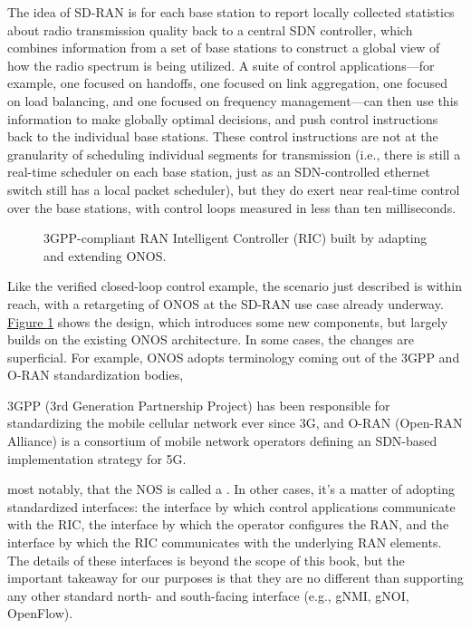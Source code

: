 \documentclass[letterpaper,11pt,english]{sphinxmanual}
\let\sphinxpxdimen\pdfpxdimen\else\newdimen\sphinxpxdimen
\begin{document}
The idea of SD-RAN is for each base station to report locally
collected statistics about radio transmission quality back to a
central SDN controller, which combines information from a set of base
stations to construct a global view of how the radio spectrum is being
utilized. A suite of control applications—for example, one focused on
handoffs, one focused on link aggregation, one focused on load
balancing, and one focused on frequency management—can then use this
information to make globally optimal decisions, and push control
instructions back to the individual base stations. These control
instructions are not at the granularity of scheduling individual
segments for transmission (i.e., there is still a real-time scheduler
on each base station, just as an SDN-controlled ethernet switch still
has a local packet scheduler), but they do exert near real-time
control over the base stations, with control loops measured in less
than ten milliseconds.

\begin{figure}[htbp]
\centering
\capstart

\noindent\sphinxincludegraphics[width=500\sphinxpxdimen]{{Slide36}.png}
\caption{3GPP-compliant RAN Intelligent Controller (RIC) built by adapting
and extending ONOS.}\label{\detokenize{future:id6}}\label{\detokenize{future:fig-ric}}\end{figure}

Like the verified closed-loop control example, the scenario just
described is within reach, with a retargeting of ONOS at the SD-RAN
use case already underway. \hyperref[\detokenize{future:fig-ric}]{Figure \ref{\detokenize{future:fig-ric}}} shows the
design, which introduces some new components, but largely builds on
the existing ONOS architecture. In some cases, the changes are
superficial. For example, ONOS adopts terminology coming out of the
3GPP and O-RAN standardization bodies,%
\begin{footnote}[1]\sphinxAtStartFootnote
3GPP (3rd Generation Partnership Project) has been responsible for
standardizing the mobile cellular network ever since 3G, and
O-RAN (Open-RAN Alliance) is a consortium of mobile network
operators defining an SDN-based implementation strategy for 5G.
%
\end{footnote} most notably, that the
NOS is called a . In other cases,
it’s a matter of adopting standardized interfaces: the 
interface by which control applications communicate with the RIC, the
 interface by which the operator configures the RAN, and the
 interface by which the RIC communicates with the underlying RAN
elements. The details of these interfaces is beyond the scope of this
book, but the important takeaway for our purposes is that they are no
different than supporting any other standard north- and south-facing
interface (e.g., gNMI, gNOI, OpenFlow).
\end{document}
